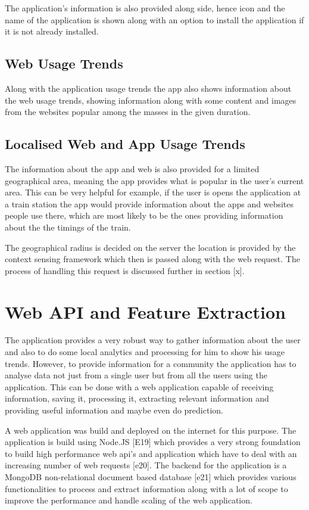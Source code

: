 \documentclass[12pt]{report}
\begin{document}
The application's information is also provided along side, hence icon and the name of the application is shown along with an option to install the application if it is not already installed.

\subsection{Web Usage Trends}

Along with the application usage trends the app also shows information about the web usage trends, showing information along with some content and images from the websites popular among the masses in the given duration.


\subsection{Localised Web and App Usage Trends}

The information about the app and web is also provided for a limited geographical area, meaning the app provides what is popular in the user's current area. This can be very helpful for example, if the user is opens the application at a train station the app would provide information about the apps and websites people use there, which are most likely to be the ones providing information about the the timings of the train.

The geographical radius is decided on the server the location is provided by the context sensing framework which then is passed along with the web request. The process of handling this request is discussed further in section [x].

\section{Web API and Feature Extraction}
The application provides a very robust way to gather information about the user and also to do some local analytics and processing for him to show his usage trends. However, to provide information for a community the application has to analyse data not just from a single user but from all the users using the application. This can be done with a web application capable of receiving information, saving it, processing it, extracting relevant information and providing useful information and maybe even do prediction.

A web application was build and deployed on the internet for this purpose. The application is build using Node.JS [E19] which provides a very strong foundation to build high performance web api's and application which have to deal with an increasing number of web requests [e20]. The backend for the application is a MongoDB non-relational document based database [e21] which provides various functionalities to process and extract information along with a lot of scope to improve the performance and handle scaling of the web application.
\end{document}
